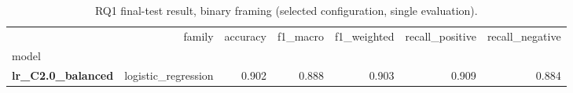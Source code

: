 \begin{table}
\caption{RQ1 final-test result, binary framing (selected configuration, single evaluation).}
\label{tab:rq1_binary}
\begin{tabular}{lrrrrrr}
\toprule
 & family & accuracy & f1_macro & f1_weighted & recall_positive & recall_negative \\
model &  &  &  &  &  &  \\
\midrule
\textbf{lr_C2.0_balanced} & logistic_regression & 0.902 & 0.888 & 0.903 & 0.909 & 0.884 \\
\bottomrule
\end{tabular}
\end{table}
